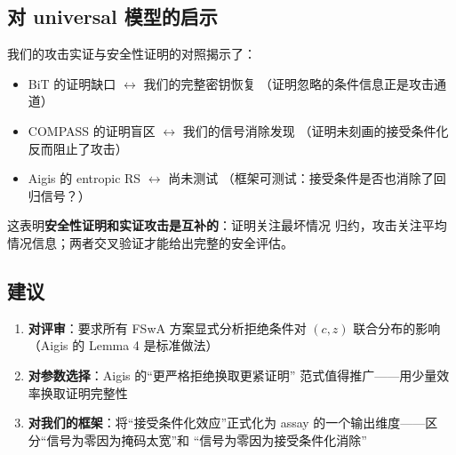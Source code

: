 \documentclass[11pt,a4paper]{ctexart}
\begin{document}
\subsection{对 universal 模型的启示}

我们的攻击实证与安全性证明的对照揭示了：

\begin{keybox}[实证与证明的互补关系]
\begin{itemize}
  \item BiT 的证明缺口 $\leftrightarrow$ 我们的完整密钥恢复
        （证明忽略的条件信息正是攻击通道）
  \item COMPASS 的证明盲区 $\leftrightarrow$ 我们的信号消除发现
        （证明未刻画的接受条件化反而阻止了攻击）
  \item Aigis 的 entropic RS $\leftrightarrow$ 尚未测试
        （框架可测试：接受条件是否也消除了回归信号？）
\end{itemize}
这表明\textbf{安全性证明和实证攻击是互补的}：证明关注最坏情况
归约，攻击关注平均情况信息；两者交叉验证才能给出完整的安全评估。
\end{keybox}

\subsection{建议}

\begin{enumerate}
  \item \textbf{对评审}：要求所有 FSwA 方案显式分析拒绝条件对 $(c,z)$
        联合分布的影响（Aigis 的 Lemma 4 是标准做法）
  \item \textbf{对参数选择}：Aigis 的``更严格拒绝换取更紧证明''
        范式值得推广——用少量效率换取证明完整性
  \item \textbf{对我们的框架}：将``接受条件化效应''正式化为 assay
        的一个输出维度——区分``信号为零因为掩码太宽''和
        ``信号为零因为接受条件化消除''
\end{enumerate}
\end{document}
